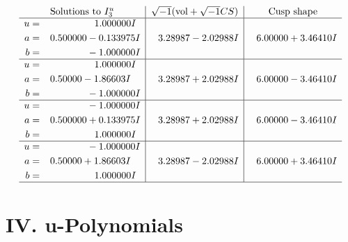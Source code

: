 \documentclass[1p]{elsarticle_modified}
\theoremstyle{definition}
\newcommand{\I}{\sqrt{-1}}
\begin{document}
$$\begin{array}{c|c|c}  
\text{Solutions to }I^u_{3}& \I (\text{vol} + \sqrt{-1}CS) & \text{Cusp shape}\\
 \hline 
\begin{aligned}
u &= \phantom{-0.000000 -}1.000000 I \\
a &= \phantom{-}0.500000 - 0.133975 I \\
b &= \phantom{-0.000000 } -1.000000 I\end{aligned}
 & \phantom{-}3.28987 - 2.02988 I & \phantom{-}6.00000 + 3.46410 I \\ \hline\begin{aligned}
u &= \phantom{-0.000000 -}1.000000 I \\
a &= \phantom{-}0.50000 - 1.86603 I \\
b &= \phantom{-0.000000 } -1.000000 I\end{aligned}
 & \phantom{-}3.28987 + 2.02988 I & \phantom{-}6.00000 - 3.46410 I \\ \hline\begin{aligned}
u &= \phantom{-0.000000 } -1.000000 I \\
a &= \phantom{-}0.500000 + 0.133975 I \\
b &= \phantom{-0.000000 -}1.000000 I\end{aligned}
 & \phantom{-}3.28987 + 2.02988 I & \phantom{-}6.00000 - 3.46410 I \\ \hline\begin{aligned}
u &= \phantom{-0.000000 } -1.000000 I \\
a &= \phantom{-}0.50000 + 1.86603 I \\
b &= \phantom{-0.000000 -}1.000000 I\end{aligned}
 & \phantom{-}3.28987 - 2.02988 I & \phantom{-}6.00000 + 3.46410 I\\
 \hline 
 \end{array}$$\newpage
\newpage\renewcommand{\arraystretch}{1}
\centering \section*{ IV. u-Polynomials}
\end{document}
